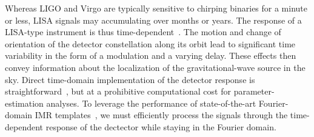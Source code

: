 \documentclass[aps,showpacs,twocolumn,
prd,superscriptaddress,nofootinbib]{revtex4-1}
\newcommand{\jgb}[1]{{\color{DarkGreen} #1}}
\begin{document}

Whereas LIGO and Virgo are typically sensitive to chirping binaries for a minute or less, LISA signals may accumulating over months or years. The response of a LISA-type instrument is thus time-dependent~\cite{Cutler97}. The motion and change of orientation of the detector constellation along its orbit lead to significant time variability in the form of a modulation and a varying delay. These effects then convey information about the localization of the gravitational-wave source in the sky. Direct time-domain implementation of the detector response is straightforward~\cite{Vallisneri04, Petiteau+08, CR02, RCP04}, but at a prohibitive computational cost for parameter-estimation analyses. To leverage the performance of state-of-the-art Fourier-domain IMR templates~\cite{BTB16,Khan+15}, we must efficiently process the signals through the time-dependent response of the dectector while staying in the Fourier domain.
\end{document}
